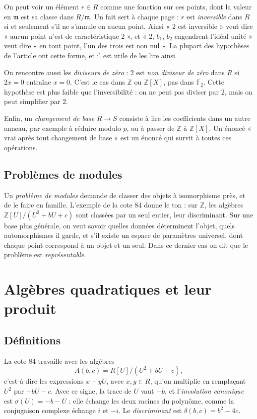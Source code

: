 \documentclass[11pt,a4paper]{amsart}
\theoremstyle{definition}
\theoremstyle{plain}
\theoremstyle{remark}
\theoremstyle{plain}
\newcommand{\Z}{\mathbb Z}
\newcommand{\F}{\mathbb F}
\begin{document}
On peut voir un élément $r \in R$ comme une fonction sur ces points, dont la valeur en $\mathfrak m$ est sa classe dans $R/\mathfrak m$. Un fait sert à chaque page : $r$ est \emph{inversible} dans $R$ si et seulement s'il ne s'annule en aucun point. Ainsi « $2$ est inversible » veut dire « aucun point n'est de caractéristique $2$ », et « $2$, $b_1$, $b_2$ engendrent l'idéal unité » veut dire « en tout point, l'un des trois est non nul ». La plupart des hypothèses de l'article ont cette forme, et il est utile de les lire ainsi.

On rencontre aussi les \emph{diviseurs de zéro} : $2$ est \emph{non diviseur de zéro} dans $R$ si $2x = 0$ entraîne $x = 0$. C'est le cas dans $\Z$ ou $\Z[X]$, pas dans $\F_2$. Cette hypothèse est plus faible que l'inversibilité : on ne peut pas diviser par $2$, mais on peut simplifier par $2$.

Enfin, un \emph{changement de base} $R \to S$ consiste à lire les coefficients dans un autre anneau, par exemple à réduire modulo $p$, ou à passer de $\Z$ à $\Z[X]$. Un énoncé « vrai après tout changement de base » est un énoncé qui survit à toutes ces opérations.

\subsection{Problèmes de modules}

Un \emph{problème de modules} demande de classer des objets à isomorphisme près, et de le faire en famille. L'exemple de la cote 84 donne le ton : sur $\Z$, les algèbres $\Z[U]/(U^2 + bU + c)$ sont classées par un seul entier, leur discriminant. Sur une base plus générale, on veut savoir quelles données déterminent l'objet, quels automorphismes il garde, et s'il existe un espace de paramètres universel, dont chaque point correspond à un objet et un seul. Dans ce dernier cas on dit que le problème est \emph{représentable}.

\section{Algèbres quadratiques et leur produit}

\subsection{Définitions}

La cote 84 travaille avec les algèbres
\[
A(b, c) = R[U]/(U^2 + bU + c),
\]
c'est-à-dire les expressions $x + yU$, avec $x, y \in R$, qu'on multiplie en remplaçant $U^2$ par $-bU - c$. Avec ce signe, la trace de $U$ vaut $-b$, et l'\emph{involution canonique} est $\sigma(U) = -b - U$ : elle échange les deux racines du polynôme, comme la conjugaison complexe échange $i$ et $-i$. Le \emph{discriminant} est $\delta(b, c) = b^2 - 4c$.
\end{document}
